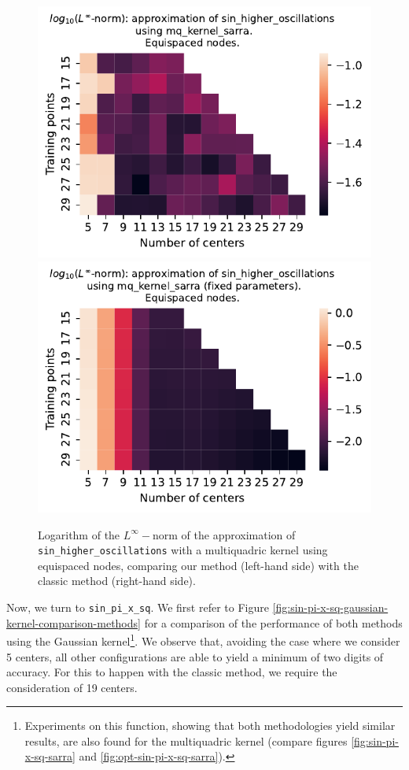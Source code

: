 \documentclass[12pt]{report} %
\begin{document}
\begin{figure}[ht]
    \centering
    \includegraphics[width=.49\textwidth]{imagenes/experiments/1d/variational/sin_higher_oscillations-Kmq_kernel_sarra-Equi.pdf}
    \includegraphics[width=.49\textwidth]{imagenes/experiments/1d/least_squares/opt-sin_higher_oscillations-Kmq_kernel_sarra-Equi.pdf}
    \caption{Logarithm of the $L^\infty-$norm of the approximation of \texttt{sin\_higher\_oscillations} with a multiquadric kernel using equispaced nodes, comparing our method (left-hand side) with the classic method (right-hand side).}
    \label{fig:sin-higher-oscillations-mq-kernel-sarra-comparison-methods}
\end{figure}

Now, we turn to \texttt{sin\_pi\_x\_sq}. We first refer to Figure \ref{fig:sin-pi-x-sq-gaussian-kernel-comparison-methods} for a comparison of the performance of both methods using the Gaussian kernel\footnote{Experiments on this function, showing that both methodologies yield similar results, are also found for the multiquadric kernel (compare figures \ref{fig:sin-pi-x-sq-sarra} and \ref{fig:opt-sin-pi-x-sq-sarra}).}. We observe that, avoiding the case where we consider 5 centers, all other configurations are able to yield a minimum of two digits of accuracy. For this to happen with the classic method, we require the consideration of 19 centers. 
\end{document}
